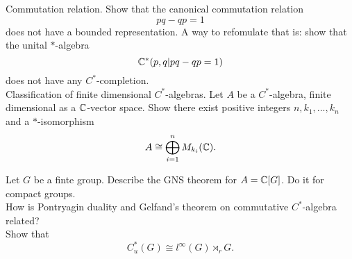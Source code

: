 Commutation relation. Show that the canonical commutation relation \[ pq-qp = 1\]
does not have a bounded representation. A way to refomulate that is: show that the unital $*$-algebra 
\[ \mathbb C^*( p,q | pq-qp =1)\]
does not have any $C^*$-completion.\\

Classification of finite dimensional $C^*$-algebras. Let $A$ be a $C^*$-algebra, finite dimensional as a $\mathbb C$-vector space. Show there exist positive integers $n,k_1,...,k_n$ and a $*$-isomorphism
\[A\cong \bigoplus_{i=1}^n M_{k_i}(\mathbb C).\]

Let $G$ be a finte group. Describe the GNS theorem for $A=\mathbb C[G]$. Do it for compact groups.\\

How is Pontryagin duality and Gelfand's theorem on commutative $C^*$-algebra related?\\

Show that 
\[C^*_u(G) \cong l^\infty(G)\rtimes_r G.\]

 
